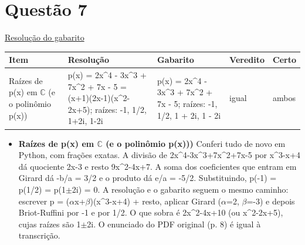 \documentclass{article}%
\begin{document}
\section*{Questão 7}%
\href{https://poliedroresolve.sistemapoliedro.com.br/vestibulares/ita/2026/ita-2-fase-dia-1-28-10-2025-2-fase-dia-1/dissertativa-7-matematica-2-fase-dia-1-ita-2026}{Resolução do gabarito}\par\smallskip%
\begin{longtable}{@{}p{} p{} p{} p{} p{}@{}}\toprule Item & Resolução & Gabarito & Veredito & Certo \\ \midrule
Raízes de p(x) em $\mathbb{C}$ (e o polinômio p(x)) & p(x) = 2x\^{}4 {-} 3x\^{}3 + 7x\^{}2 + 7x {-} 5 = (x+1)(2x{-}1)(x\^{}2{-}2x+5); raízes: {-}1, 1/2, 1+2i, 1{-}2i & p(x) = 2x\^{}4 {-} 3x\^{}3 + 7x\^{}2 + 7x {-} 5; raízes: {-}1, 1/2, 1 + 2i, 1 {-} 2i & igual & ambos \\
\bottomrule\end{longtable}%
\begin{itemize}%
\item%
\textbf{Raízes de p(x) em $\mathbb{C}$ (e o polinômio p(x)))} Conferi tudo de novo em Python, com frações exatas. A divisão de 2x\^{}4{-}3x\^{}3+7x\^{}2+7x{-}5 por x\^{}3{-}x+4 dá quociente 2x{-}3 e resto 9x\^{}2{-}4x+7. A soma dos coeficientes que entram em Girard dá {-}b/a = 3/2 e o produto dá e/a = {-}5/2. Substituindo, p({-}1) = p(1/2) = p(1$\pm$2i) = 0. A resolução e o gabarito seguem o mesmo caminho: escrever p = ($\alpha$x+$\beta$)(x\^{}3{-}x+4) + resto, aplicar Girard ($\alpha$=2, $\beta$={-}3) e depois Briot{-}Ruffini por {-}1 e por 1/2. O que sobra é 2x\^{}2{-}4x+10 (ou x\^{}2{-}2x+5), cujas raízes são 1$\pm$2i. O enunciado do PDF original (p. 8) é igual à transcrição.%
\end{itemize}%
\end{document}
